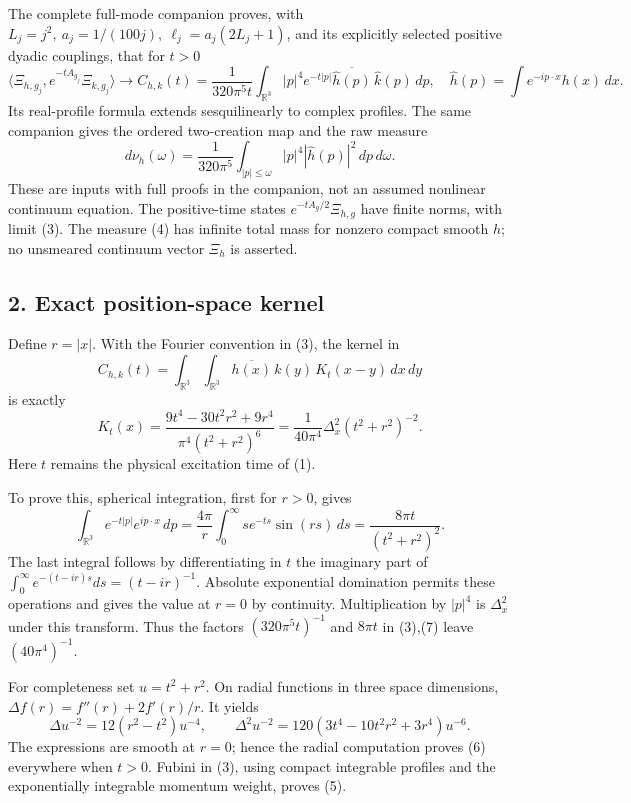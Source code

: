 \documentclass[
  11pt,
]{article}
\begin{document}
The complete full-mode companion proves, with
\(L_j=j^2,\ a_j=1/(100j),\ \ell_j=a_j(2L_j+1)\), and its explicitly
selected positive dyadic couplings, that for \(t>0\) \[
 \langle\Xi_{h,g_j},e^{-tA_{g_j}}\Xi_{k,g_j}\rangle
 \longrightarrow
 C_{h,k}(t)=\frac1{320\pi^5t}\int_{\mathbb R^3}
 |p|^4e^{-t|p|}\overline{\widehat h(p)}\,\widehat k(p)\,dp,
 \quad \widehat h(p)=\int e^{-ip\cdot x}h(x)\,dx .
 \tag{3}
\] Its real-profile formula extends sesquilinearly to complex profiles.
The same companion gives the ordered two-creation map and the raw
measure \[
 d\nu_h(\omega)=\frac1{320\pi^5}
       \int_{|p|\le\omega}|p|^4|\widehat h(p)|^2\,dp\,d\omega .
 \tag{4}
\] These are inputs with full proofs in the companion, not an assumed
nonlinear continuum equation. The positive-time states
\(e^{-tA_g/2}\Xi_{h,g}\) have finite norms, with limit (3). The measure
(4) has infinite total mass for nonzero compact smooth \(h\); no
unsmeared continuum vector \(\Xi_h\) is asserted.

\subsection{2. Exact position-space
kernel}\label{weak-coupling-part-11-exact-position-space-kernel}

Define \(r=|x|\). With the Fourier convention in (3), the kernel in \[
 C_{h,k}(t)=\int_{\mathbb R^3}\int_{\mathbb R^3}
                  \overline{h(x)}\,k(y)\,K_t(x-y)\,dx\,dy
 \tag{5}
\] is exactly \[
 \boxed{K_t(x)=
 \frac{9t^4-30t^2r^2+9r^4}{\pi^4(t^2+r^2)^6}
 =\frac1{40\pi^4}\Delta_x^2(t^2+r^2)^{-2}.}
 \tag{6}
\] Here \(t\) remains the physical excitation time of (1).

To prove this, spherical integration, first for \(r>0\), gives \[
 \int_{\mathbb R^3}e^{-t|p|}e^{ip\cdot x}\,dp
 =\frac{4\pi}{r}\int_0^\infty se^{-ts}\sin(rs)\,ds
 =\frac{8\pi t}{(t^2+r^2)^2}.
 \tag{7}
\] The last integral follows by differentiating in \(t\) the imaginary
part of \(\int_0^\infty e^{-(t-ir)s}ds=(t-ir)^{-1}\). Absolute
exponential domination permits these operations and gives the value at
\(r=0\) by continuity. Multiplication by \(|p|^4\) is \(\Delta_x^2\)
under this transform. Thus the factors \((320\pi^5t)^{-1}\) and
\(8\pi t\) in (3),(7) leave \((40\pi^4)^{-1}\).

For completeness set \(u=t^2+r^2\). On radial functions in three space
dimensions, \(\Delta f(r)=f''(r)+2f'(r)/r\). It yields \[
 \Delta u^{-2}=12(r^2-t^2)u^{-4},\qquad
 \Delta^2u^{-2}
       =120(3t^4-10t^2r^2+3r^4)u^{-6}.
 \tag{8}
\] The expressions are smooth at \(r=0\); hence the radial computation
proves (6) everywhere when \(t>0\). Fubini in (3), using compact
integrable profiles and the exponentially integrable momentum weight,
proves (5).
\end{document}
